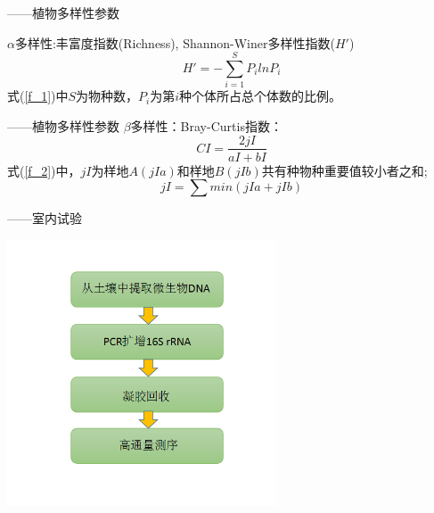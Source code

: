 \begin{frame}{\insertsubsection——植物多样性参数}
	
	$\alpha$多样性:丰富度指数(Richness), Shannon-Winer多样性指数($H'$)
	\begin{equation}\label{f_1}
	H'=-\sum_{i=1}^{S}P_i lnP_i
	\end{equation}	
	式(\ref{f_1})中$S$为物种数，$P_i$为第$i$种个体所占总个体数的比例。
\end{frame}
\begin{frame}{\insertsubsection——植物多样性参数}	
	$\beta$多样性：Bray-Curtis指数：
	\begin{equation}\label{f_2}
	 CI=\frac{2jI}{aI+bI}
	\end{equation}	
	式(\ref{f_2})中，$jI$为样地$A(jI a)$和样地$B(jI b)$共有种物种重要值较小者之和;	
	\begin{equation}\label{f_3}
	jI=\sum min(jIa+jIb)
	\end{equation}
\end{frame}
\begin{frame}{\insertsubsection——室内试验}
	
	
		\begin{center}
			\includegraphics[width = 0.6\textwidth]{./pic/2.1.3.png}
		\end{center}
\end{frame}


